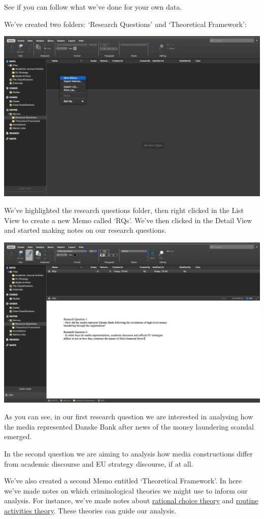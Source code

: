 \documentclass[
]{book}
\begin{document}
See if you can follow what we've done for your own data.

We've created two folders: `Research Questions' and `Theoretical Framework':

\includegraphics{imgs/memos_folders.png}

We've highlighted the research questions folder, then right clicked in the List View to create a new Memo called `RQs'. We've then clicked in the Detail View and started making notes on our research questions.

\includegraphics{imgs/notes_rq.png}

As you can see, in our first research question we are interested in analysing how the media represented Danske Bank after news of the money laundering scandal emerged.

In the second question we are aiming to analysis how media constructions differ from academic discourse and EU strategy discourse, if at all.

We've also created a second Memo entitled `Theoretical Framework'. In here we've made notes on which criminological theories we might use to inform our analysis. For instance, we've made notes about \href{https://en.wikipedia.org/wiki/Rational_choice_theory_(criminology)}{rational choice theory} and \href{https://en.wikipedia.org/wiki/Routine_activity_theory}{routine activities theory}. These theories can guide our analysis.
\end{document}
